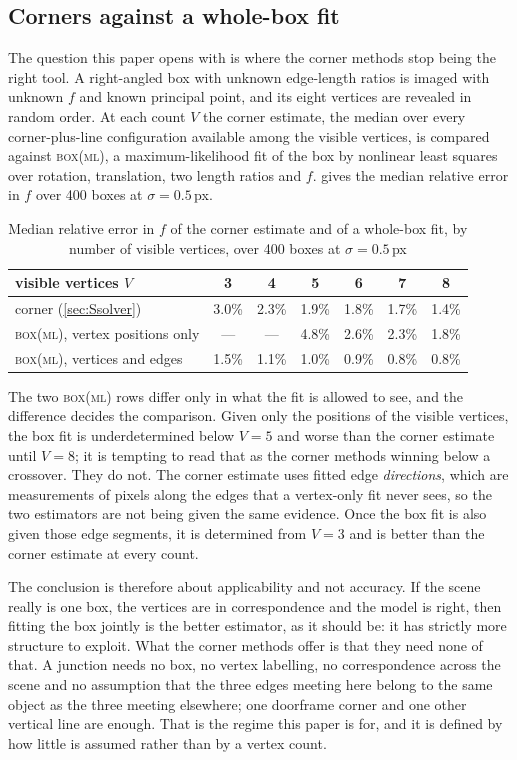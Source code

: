 \subsection{Corners against a whole-box fit}\label{sec:e9}
The question this paper opens with is where the corner methods stop being the right tool. A right-angled box with unknown edge-length ratios is imaged with unknown $f$ and known principal point, and its eight vertices are revealed in random order. At each count $V$ the corner estimate, the median over every corner-plus-line configuration available among the visible vertices, is compared against \textsc{box(ml)}, a maximum-likelihood fit of the box by nonlinear least squares over rotation, translation, two length ratios and $f$.  gives the median relative error in $f$ over 400 boxes at $\sigma=0.5$\,px.

\begin{table}[t]
\centering\small
\caption{Median relative error in $f$ of the corner estimate and of a whole-box fit, by number of visible vertices, over 400 boxes at $\sigma=0.5$\,px}
\label{tab:box}
\begin{tabular}{lcccccc}
\toprule
visible vertices $V$ & 3 & 4 & 5 & 6 & 7 & 8\\
\midrule
corner (\cref{sec:Ssolver})              & 3.0\% & 2.3\% & 1.9\% & 1.8\% & 1.7\% & 1.4\%\\
\textsc{box(ml)}, vertex positions only & ---   & ---   & 4.8\% & 2.6\% & 2.3\% & 1.8\%\\
\textsc{box(ml)}, vertices and edges    & 1.5\% & 1.1\% & 1.0\% & 0.9\% & 0.8\% & 0.8\%\\
\bottomrule
\end{tabular}
\end{table}

The two \textsc{box(ml)} rows differ only in what the fit is allowed to see, and the difference decides the comparison. Given only the positions of the visible vertices, the box fit is underdetermined below $V=5$ and worse than the corner estimate until $V=8$; it is tempting to read that as the corner methods winning below a crossover. They do not. The corner estimate uses fitted edge \emph{directions}, which are measurements of pixels along the edges that a vertex-only fit never sees, so the two estimators are not being given the same evidence. Once the box fit is also given those edge segments, it is determined from $V=3$ and is better than the corner estimate at every count.

The conclusion is therefore about applicability and not accuracy. If the scene really is one box, the vertices are in correspondence and the model is right, then fitting the box jointly is the better estimator, as it should be: it has strictly more structure to exploit. What the corner methods offer is that they need none of that. A junction needs no box, no vertex labelling, no correspondence across the scene and no assumption that the three edges meeting here belong to the same object as the three meeting elsewhere; one doorframe corner and one other vertical line are enough. That is the regime this paper is for, and it is defined by how little is assumed rather than by a vertex count.

